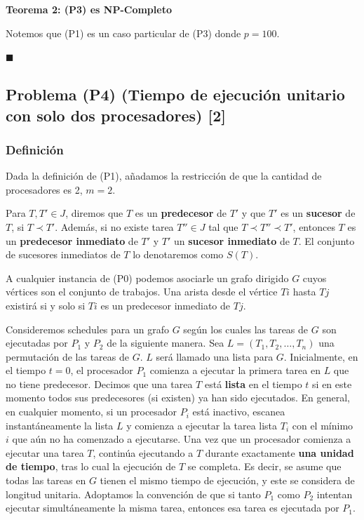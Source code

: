 \documentclass[14pt]{extarticle}
\begin{document}
\textbf{Teorema 2: (P3) es NP-Completo}

Notemos que (P1) es un caso particular de (P3) donde $p = 100$.

$\blacksquare$

\subsection*{Problema (P4) (Tiempo de ejecución unitario con solo dos procesadores) [2]}

\subsubsection*{Definición}

Dada la definición de (P1), añadamos la restricción de que la cantidad de procesadores es 2, $m = 2$.

Para $T, T' \in J$, diremos que $T$ es un \textbf{predecesor} de $T'$ y que $T'$ es un \textbf{sucesor} de $T$, si $T \prec T'$. Además, si no existe tarea $T'' \in J$ tal que $T \prec T'' \prec T'$, entonces $T$ es un \textbf{predecesor inmediato} de $T'$ y $T'$ un \textbf{sucesor inmediato} de $T$. El conjunto de sucesores inmediatos de $T$ lo denotaremos como $S(T)$.

A cualquier instancia de (P0) podemos asociarle un grafo dirigido $G$ cuyos vértices son el conjunto de trabajos. Una arista desde el vértice $Ti$ hasta $Tj$ existirá si y solo si $Ti$ es un predecesor inmediato de $Tj$.

Consideremos schedules para un grafo $G$ según los cuales las tareas de $G$ son ejecutadas por $P_1$ y $P_2$ de la siguiente manera. Sea $L = (T_1, T_2, \dots, T_n)$ una permutación de las tareas de $G$. $L$ será llamado una lista para $G$. Inicialmente, en el tiempo $t = 0$, el procesador $P_1$ comienza a ejecutar la primera tarea en $L$ que no tiene predecesor. Decimos que una tarea $T$ está \textbf{lista} en el tiempo $t$ si en este momento todos sus predecesores (si existen) ya han sido ejecutados. En general, en cualquier momento, si un procesador $P_i$ está inactivo, escanea instantáneamente la lista $L$ y comienza a ejecutar la tarea lista $T_i$ con el mínimo $i$ que aún no ha comenzado a ejecutarse. Una vez que un procesador comienza a ejecutar una tarea $T$, continúa ejecutando a $T$ durante exactamente \textbf{una unidad de tiempo}, tras lo cual la ejecución de $T$ se completa. Es decir, se asume que todas las tareas en $G$ tienen el mismo tiempo de ejecución, y este se considera de longitud unitaria. Adoptamos la convención de que si tanto $P_1$ como $P_2$ intentan ejecutar simultáneamente la misma tarea, entonces esa tarea es ejecutada por $P_1$.
\end{document}
